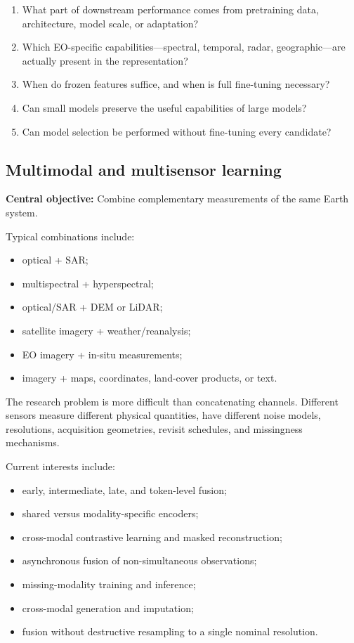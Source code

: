 \documentclass[
  a4paper,
  11pt]{article}
\providecommand{\tightlist}{%
  \setlength{\itemsep}{0pt}\setlength{\parskip}{0pt}}
\begin{document}
\begin{enumerate}
\def\labelenumi{\arabic{enumi}.}
\tightlist
\item
  What part of downstream performance comes from pretraining data,
  architecture, model scale, or adaptation?
\item
  Which EO-specific capabilities---spectral, temporal, radar,
  geographic---are actually present in the representation?
\item
  When do frozen features suffice, and when is full fine-tuning
  necessary?
\item
  Can small models preserve the useful capabilities of large models?
\item
  Can model selection be performed without fine-tuning every candidate?
\end{enumerate}

\hypertarget{multimodal-and-multisensor-learning}{%
\subsection{Multimodal and multisensor
learning}\label{multimodal-and-multisensor-learning}}

\textbf{Central objective:} Combine complementary measurements of the
same Earth system.

Typical combinations include:

\begin{itemize}
\tightlist
\item
  optical + SAR;
\item
  multispectral + hyperspectral;
\item
  optical/SAR + DEM or LiDAR;
\item
  satellite imagery + weather/reanalysis;
\item
  EO imagery + in-situ measurements;
\item
  imagery + maps, coordinates, land-cover products, or text.
\end{itemize}

The research problem is more difficult than concatenating channels.
Different sensors measure different physical quantities, have different
noise models, resolutions, acquisition geometries, revisit schedules,
and missingness mechanisms.

Current interests include:

\begin{itemize}
\tightlist
\item
  early, intermediate, late, and token-level fusion;
\item
  shared versus modality-specific encoders;
\item
  cross-modal contrastive learning and masked reconstruction;
\item
  asynchronous fusion of non-simultaneous observations;
\item
  missing-modality training and inference;
\item
  cross-modal generation and imputation;
\item
  fusion without destructive resampling to a single nominal resolution.
\end{itemize}
\end{document}
